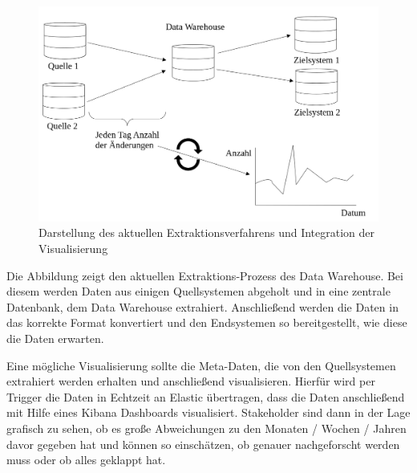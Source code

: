 \begin{figure}[h]
\centering
\includegraphics[width=150mm,scale=1]{content/Darstellung_vis_pipeline.png}
\caption{Darstellung des aktuellen Extraktionsverfahrens und Integration der Visualisierung }%
\end{figure}
Die Abbildung zeigt den aktuellen Extraktions-Prozess des Data Warehouse. 
Bei diesem werden Daten aus einigen Quellsystemen abgeholt und in eine zentrale Datenbank, dem Data Warehouse extrahiert.
Anschließend werden die Daten in das korrekte Format konvertiert und den Endsystemen so bereitgestellt, wie diese die Daten erwarten.

Eine mögliche Visualisierung sollte die Meta-Daten, die von den Quellsystemen extrahiert werden erhalten und anschließend visualisieren.
Hierfür wird per Trigger die Daten in Echtzeit an Elastic übertragen, dass die Daten anschließend mit Hilfe eines Kibana Dashboards visualisiert.
Stakeholder sind dann in der Lage grafisch zu sehen, ob es große Abweichungen zu den Monaten / Wochen / Jahren davor gegeben hat und können so einschätzen, ob genauer nachgeforscht werden muss oder ob alles geklappt hat.


















